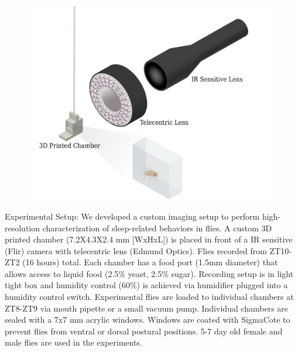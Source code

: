 \begin{figure}[ht!]
	\centering
	\includegraphics[width=0.75\linewidth]{figures/ExperimentalSetup.pdf}
	\caption{}
\end{figure}
Experimental Setup: We developed a custom imaging setup to perform high-resolution characterization of sleep-related behaviors in flies.
A custom 3D printed chamber (7.2X4.3X2.4 mm [WxHxL]) is placed in front of a IR sensitive (Flir) camera with telecentric lens (Edmund Optics).
Flies recorded from ZT10-ZT2 (16 hours) total.
Each chamber has a food port (1.5mm diameter) that allows access to liquid food (2.5\% yeast, 2.5\% sugar).
Recording setup is in light tight box and humidity control (60\%) is achieved via humidifier plugged into a humidity control switch.
Experimental flies are loaded to individual chambers at ZT8-ZT9 via mouth pipette or a small vacuum pump.
Individual chambers are sealed with a 7x7 mm acrylic windows.
Windows are coated with SigmaCote to prevent flies from ventral or dorsal postural positions.
5-7 day old female and male flies are used in the experiments.

